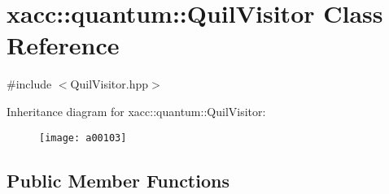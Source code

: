 \hypertarget{a00103}{}\section{xacc\+:\+:quantum\+:\+:Quil\+Visitor Class Reference}
\label{a00103}


{\ttfamily \#include $<$Quil\+Visitor.\+hpp$>$}

Inheritance diagram for xacc\+:\+:quantum\+:\+:Quil\+Visitor\+:\begin{figure}[H]
\begin{center}
\leavevmode
\texttt{[image: a00103]}
\end{center}
\end{figure}
\subsection*{Public Member Functions}
